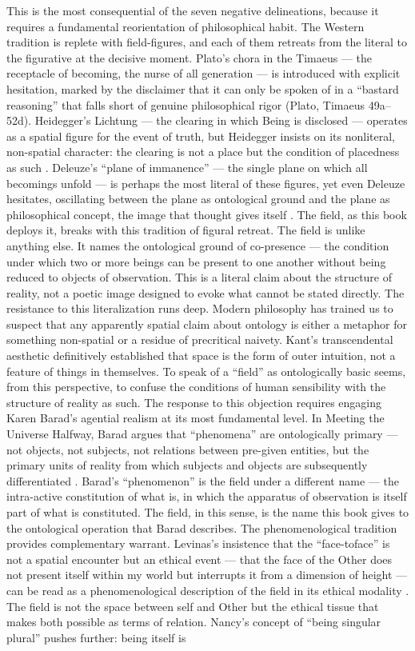 This is the most consequential of the seven negative delineations, because it requires a fundamental reorientation of philosophical habit. The Western tradition is replete with field-figures, and each of them retreats from the literal to the figurative at the decisive moment. Plato’s chora in the Timaeus — the receptacle of becoming, the nurse of all generation — is introduced with explicit hesitation, marked by the disclaimer that it can only be spoken of in a “bastard reasoning” that falls short of genuine philosophical rigor (Plato, Timaeus 49a– 52d). Heidegger’s Lichtung — the clearing in which Being is disclosed — operates as a spatial figure for the event of truth, but Heidegger insists on its nonliteral, non-spatial character: the clearing is not a place but the condition of placedness as such \cite{heidegger_1927}. Deleuze’s “plane of immanence” — the single plane on which all becomings unfold — is perhaps the most literal of these figures, yet even Deleuze hesitates, oscillating between the plane as ontological ground and the plane as philosophical concept, the image that thought gives itself \cite{deleuze_guattari_1991}. The field, as this book deploys it, breaks with this tradition of figural retreat. The field is unlike anything else. It names the ontological ground of co-presence — the condition under which two or more beings can be present to one another without being reduced to objects of observation. This is a literal claim about the structure of reality, not a poetic image designed to evoke what cannot be stated directly. The resistance to this literalization runs deep. Modern philosophy has trained us to suspect that any apparently spatial claim about ontology is either a metaphor for something non-spatial or a residue of precritical naivety. Kant’s transcendental aesthetic definitively established that space is the form of outer intuition, not a feature of things in themselves. To speak of a “field” as ontologically basic seems, from this perspective, to confuse the conditions of human sensibility with the structure of reality as such. The response to this objection requires engaging Karen Barad’s agential realism at its most fundamental level. In Meeting the Universe Halfway, Barad argues that “phenomena” are ontologically primary — not objects, not subjects, not relations between pre-given entities, but the primary units of reality from which subjects and objects are subsequently differentiated \cite{barad_2007}. Barad’s “phenomenon” is the field under a different name — the intra-active constitution of what is, in which the apparatus of observation is itself part of what is constituted. The field, in this sense, is the name this book gives to the ontological operation that Barad describes. The phenomenological tradition provides complementary warrant. Levinas’s insistence that the “face-toface” is not a spatial encounter but an ethical event — that the face of the Other does not present itself within my world but interrupts it from a dimension of height — can be read as a phenomenological description of the field in its ethical modality \cite{levinas_1961}. The field is not the space between self and Other but the ethical tissue that makes both possible as terms of relation. Nancy’s concept of “being singular plural” pushes further: being itself is 